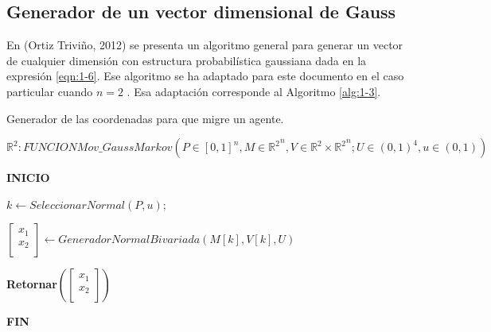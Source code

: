 \subsection{Generador de un vector dimensional de Gauss}
En (Ortiz Triviño, 2012) se presenta un algoritmo general para generar un vector de cualquier dimensión con estructura probabilística gaussiana dada en la expresión \ref{eqn:1-6}.  Ese algoritmo se ha adaptado para este documento en el caso particular cuando $n=2$ .  Esa adaptación corresponde al Algoritmo \ref{alg:1-3}.
\begin{algorithm}
    \caption{Generador de las coordenadas    para que migre un agente.}
    \label{alg:1-2}
    \textbf{$\mathbb{R}^2:FUNCIONMov\_GaussMarkov(P\in[0,1]^n,M\in{\mathbb{R}^2}^n,V\in{\mathbb{R}^2\times\mathbb{R}^2}^n;U\in(0,1)^4,u\in(0,1))$}
    \begin{flushleft}
    \textbf{INICIO}\\
    \end{flushleft}
    
    \begin{algorithmic}
    
    
    \State $k\gets SeleccionarNormal\left(P,u\right);$
    
    \State $[\begin{matrix}x_1\\x_2\\\end{matrix}]\gets GeneradorNormalBivariada(M[k],V[k],U)$
    \begin{flushleft}
    \textbf{Retornar$([\begin{matrix}x_1\\x_2\\\end{matrix}])$}
    \end{flushleft}
    
       
    \end{algorithmic}
    \begin{flushleft}
    \textbf{FIN}
    \end{flushleft}
\end{algorithm}


